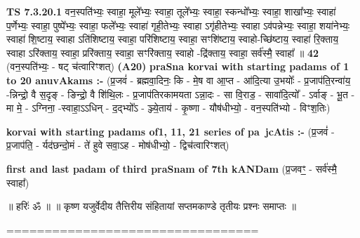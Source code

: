 \documentclass[17pt]{extarticle}
\begin{document}
                                        \textbf{ TS 7.3.20.1} \newline
                  वन॒स्पति॑भ्यः॒ स्वाहा॒ मूले᳚भ्यः॒ स्वाहा॒ तूले᳚भ्यः॒ स्वाहा॒ स्कन्धो᳚भ्यः॒ स्वाहा॒ शाखा᳚भ्यः॒ स्वाहा॑ प॒र्णेभ्यः॒ स्वाहा॒ पुष्पे᳚भ्यः॒ स्वाहा॒ फले᳚भ्यः॒ स्वाहा॑ गृही॒तेभ्यः॒ स्वाहा ऽगृ॑हीतेभ्यः॒ स्वाहा ऽव॑पन्नेभ्यः॒ स्वाहा॒ शया॑नेभ्यः॒ स्वाहा॑ शि॒ष्टाय॒ स्वाहा ऽति॑शिष्टाय॒ स्वाहा॒ परि॑शिष्टाय॒ स्वाहा॒ सꣳशि॑ष्टाय॒ स्वाहो-च्छि॑ष्टाय॒ स्वाहा॑ रि॒क्ताय॒ स्वाहा ऽरि॑क्ताय॒ स्वाहा॒ प्ररि॑क्ताय॒ स्वाहा॒ सꣳरि॑क्ताय॒ स्वाहो -द्रि॑क्ताय॒ स्वाहा॒ सर्व॑स्मै॒ स्वाहा᳚ ॥ \textbf{  42 } \newline
                  \newline
                      (वन॒स्पति॑भ्यः॒ - षट् च॑त्वारिꣳशत्)  \textbf{(A20)} \newline \newline
                \textbf{praSna korvai with starting padams of 1 to 20 anuvAkams :-} \newline
        (प्र॒जवं॑ - ब्रह्मवा॒दिनः॒ कि - मे॒ष वा आ॒प्त - आ॑दि॒त्या उ॒भयोः᳚ - प्र॒जाप॑ति॒रन्वा॑य॒ -न्निन्द्रो॒ वै स॒दृङ् - ङिन्द्रो॒ वै शि॑थि॒लः - प्र॒जाप॑तिरकामयता ऽन्ना॒दः - सा वि॒राड॒ - सावा॑दि॒त्यो᳚ - ऽर्वाङ् - भू॒त - मा मे॒ - ऽग्निना॒ -स्वाहा॒ऽऽधिन् - द॒द्भ्यो᳚ऽ - ञ्ज्ये॒ताय॑ - कृ॒ष्णा - यौष॑धीभ्यो॒ - वन॒स्पति॑भ्यो - विꣳश॒तिः) \newline

        \textbf{korvai with starting padams of1, 11, 21 series of pa~jcAtis :-} \newline
        (प्र॒जवं॑ - प्र॒जाप॑ति॒ - र्यद॑छन्दो॒मं - ते॑ हुवे सवा॒ऽह - मोष॑धीभ्यो॒ - द्विच॑त्वारिꣳशत्) \newline

        \textbf{first and last padam of third praSnam of 7th kANDam} \newline
        (प्र॒जवꣳ॒॒ - सर्व॑स्मै॒ स्वाहा᳚) \newline 

        
        ॥ हरिः॑ ॐ ॥
॥ कृष्ण यजुर्वेदीय तैत्तिरीय संहितायां सप्तमकाण्डे तृतीयः प्रश्नः समाप्तः ॥

================================= \newline
        \pagebreak
                \pagebreak
        
\end{document}
